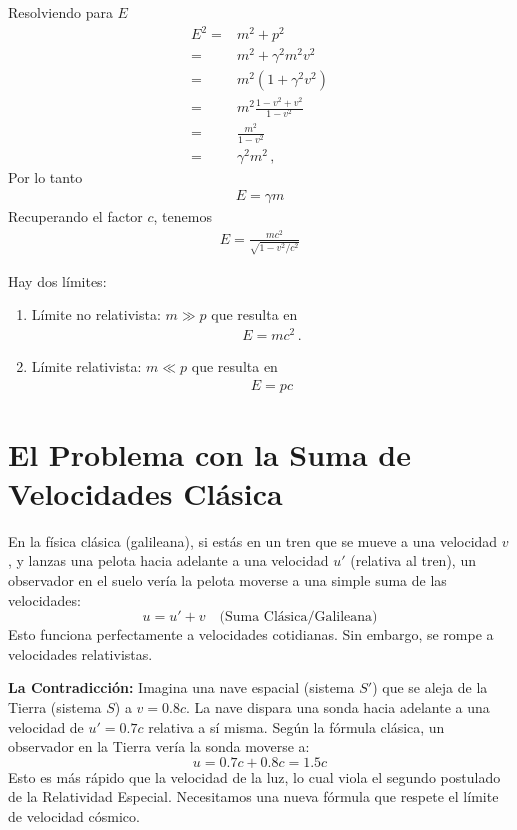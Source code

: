 \documentclass[11pt,a4paper]{article}
\begin{document}
Resolviendo para $E$
\begin{align*}
    E^2 =& m^2 + p^2\\
         =& m^2 + \gamma^2 m^2 v^2\\
         =& m^2(1+\gamma^2 v^2)\\
         =& m^2 \frac{1-v^2 + v^2}{1-v^2}\\
         =& \frac{m^2}{1-v^2}\\
         =& \gamma^2 m^2\,,
\end{align*}
Por lo tanto
\begin{align}
    E = \gamma m
\end{align}
Recuperando el factor $c$, tenemos
\begin{align}
    E = \frac{m c^2}{\sqrt{1-v^2/c^2}}
\end{align}

Hay dos límites:

\begin{enumerate}
    \item Límite no relativista: $m\gg p$ que resulta en 
    \begin{align*}
        E = m c^2\,.
    \end{align*}
    \item Límite relativista: $m \ll p$ que resulta en
    \begin{align*}
        E = pc
    \end{align*}
\end{enumerate}



\section{El Problema con la Suma de Velocidades Clásica}

En la física clásica (galileana), si estás en un tren que se mueve a una velocidad $v$, y lanzas una pelota hacia adelante a una velocidad $u'$ (relativa al tren), un observador en el suelo vería la pelota moverse a una simple suma de las velocidades:
\[ u = u' + v \quad \text{(Suma Clásica/Galileana)} \]
Esto funciona perfectamente a velocidades cotidianas. Sin embargo, se rompe a velocidades relativistas.

\textbf{La Contradicción:} Imagina una nave espacial (sistema $S'$) que se aleja de la Tierra (sistema $S$) a $v=0.8c$. La nave dispara una sonda hacia adelante a una velocidad de $u'=0.7c$ relativa a sí misma. Según la fórmula clásica, un observador en la Tierra vería la sonda moverse a:
\[ u = 0.7c + 0.8c = 1.5c \]
Esto es más rápido que la velocidad de la luz, lo cual viola el segundo postulado de la Relatividad Especial. Necesitamos una nueva fórmula que respete el límite de velocidad cósmico.
\end{document}
